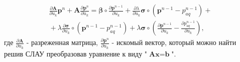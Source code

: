 \documentclass[14pt]{article}
\begin{document}
\begin{eqnarray} \label{dFP_du}
\frac{\partial \boldsymbol{A}}{\partial u_k}\boldsymbol{p}^n + \boldsymbol{A}\frac{\partial \boldsymbol{p}^n}{\partial u_k} =
\boldsymbol{\beta}\circ\frac{\partial \boldsymbol{p}^{n-1}}{\partial u_k} + \frac{\partial \lambda}{\partial u_k}\boldsymbol{\sigma}\circ(\boldsymbol{p}^{n-1}-p_{aq}^{n-1})+ {} \nonumber\\
{} + 
\lambda\frac{\partial \boldsymbol{\sigma}}{\partial u_k}\circ(\boldsymbol{p}^{n-1}-p_{aq}^{n-1})+
\lambda\boldsymbol{\sigma}\circ\left(\frac{\partial \boldsymbol{p}^{n-1}}{\partial u_k}-\frac{\partial p_{aq}^{n-1}}{\partial u_k}\right),
\end{eqnarray}
где $ \frac{\partial \boldsymbol{A}}{\partial u_k} $ - разреженная матрица, $ \frac{\partial \boldsymbol{p}^n}{\partial u_k} $ - искомый вектор, который можно найти решив СЛАУ преобразовав уравнение к виду "$\textbf{A}\textbf{x}=\textbf{b}$".
\end{document}
